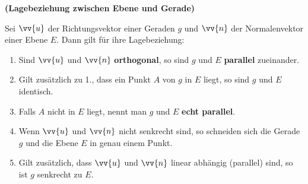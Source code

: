 \documentclass[ngerman, 12pt]{nssheetxea}
\begin{document}
\begin{theorem} \textbf{(Lagebeziehung zwischen Ebene und Gerade)  } \par
Sei $\vv{u}$ der Richtungsvektor einer Geraden $g$ und $\vv{n}$ der Normalenvektor einer Ebene $E$. Dann gilt für ihre Lagebeziehung:
\begin{enumerate}
\item Sind $\vv{u}$ und $\vv{n}$ \textbf{orthogonal}, so sind $g$ und $E$ \textbf{parallel} zueinander. 
\item Gilt zusätzlich zu 1., dass ein Punkt $A$ von $g$ in $E$ liegt, so sind $g$ und $E$ identisch.
\item Falls $A$ nicht in $E$ liegt, nennt man $g$ und $E$ \textbf{echt parallel}.
\item Wenn $\vv{u}$ und $\vv{n}$ nicht senkrecht sind, so schneiden sich die Gerade $g$ und die Ebene $E$ in genau einem Punkt. 
\item Gilt zusätzlich, dass $\vv{u}$ und $\vv{n}$ linear abhängig (parallel) sind, so ist $g$ senkrecht zu $E$.
\end{enumerate}
\label{Satz:LageEbeneGerade}
\end{theorem}
\end{document}
